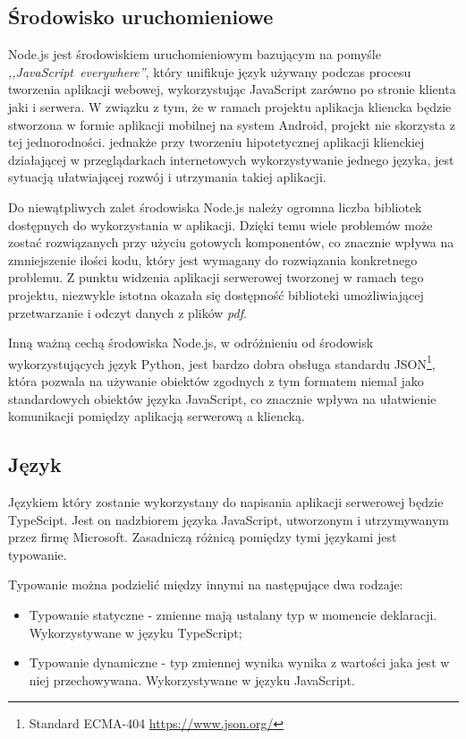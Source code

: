 \documentclass[a4paper,12pt,twoside,openany]{report}
\begin{document}
\subsection{Środowisko uruchomieniowe}
Node.js jest środowiskiem uruchomieniowym bazującym na pomyśle \textit{,,JavaScript~everywhere''}, który unifikuje język używany podczas procesu tworzenia aplikacji webowej, wykorzystując JavaScript zarówno po stronie klienta jaki i serwera. W związku z tym, że w ramach projektu aplikacja kliencka będzie stworzona w formie aplikacji mobilnej na system Android, projekt nie skorzysta z tej jednorodności. jednakże przy tworzeniu hipotetycznej aplikacji klienckiej działającej w przeglądarkach internetowych wykorzystywanie jednego języka, jest  sytuacją ułatwiającej rozwój i utrzymania takiej aplikacji.

Do niewątpliwych zalet środowiska Node.js należy ogromna liczba bibliotek dostępnych do wykorzystania w aplikacji. Dzięki temu wiele problemów może zostać rozwiązanych przy użyciu gotowych komponentów, co znacznie wpływa na zmniejszenie ilości kodu, który jest wymagany do rozwiązania konkretnego problemu. Z punktu widzenia aplikacji serwerowej tworzonej w ramach tego projektu, niezwykle istotna okazała się dostępność biblioteki umożliwiającej przetwarzanie i odczyt danych z plików \textit{pdf}. 

Inną ważną cechą środowiska Node.js, w odróżnieniu od środowisk wykorzystujących  język Python, jest bardzo dobra obsługa standardu JSON\footnote{Standard ECMA-404 \url{https://www.json.org/}}, która pozwala na używanie obiektów zgodnych z tym formatem niemal jako standardowych obiektów języka JavaScript, co znacznie wpływa na ułatwienie komunikacji pomiędzy aplikacją serwerową a kliencką. 

\subsection{Język}
Językiem który zostanie wykorzystany do napisania aplikacji serwerowej będzie TypeScipt. Jest on nadzbiorem języka JavaScript, utworzonym i utrzymywanym przez firmę Microsoft. Zasadniczą różnicą pomiędzy tymi językami jest typowanie.

Typowanie można podzielić między innymi na następujące dwa rodzaje:
\begin{itemize}
	\item Typowanie statyczne - zmienne mają ustalany typ w momencie deklaracji. Wykorzystywane w języku TypeScript;
	\item Typowanie dynamiczne -  typ zmiennej wynika wynika z wartości jaka jest w niej przechowywana. Wykorzystywane w języku JavaScript.
\end{itemize}
\end{document}
